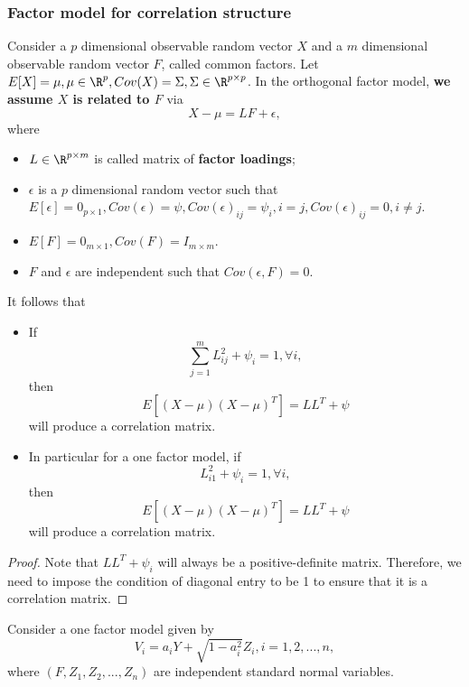 \begin{refsection}
\subsubsection{Factor model for correlation structure}

\begin{lemma}\label{ch:statistical-models:th:ConditionForCorrelationStructureFactorModel}
Consider a $p$ dimensional observable random vector $X$ and a $m$ dimensional observable random vector $F$, called common factors. Let $E[X] = \mu, \mu\in \R^p, Cov(X) = \Sigma,\Sigma\in\R^{p\times p}$. 
In the orthogonal factor model, \textbf{we assume $X$ is related to $F$} via
$$X - \mu = L F + \epsilon,$$
where 
\begin{itemize}
	\item $L\in \R^{p\times m}$ is called matrix of \textbf{factor loadings};
	\item $\epsilon$ is a $p$ dimensional random vector such that $E[\epsilon] = 0_{p\times 1}, Cov(\epsilon) = \psi, Cov(\epsilon)_{ij} = \psi_{i}, i = j, Cov(\epsilon)_{ij} = 0, i\neq j$.
	\item $E[F] = 0_{m\times 1}, Cov(F) = I_{m\times m}.$
	\item $F$ and $\epsilon$ are independent such that $Cov(\epsilon, F) = 0$.
\end{itemize}

It follows that
\begin{itemize}
	\item If 
	$$\sum_{j=1}^m L_{ij}^2 + \psi_i = 1, \forall i,$$
	then $$E[(X-\mu)(X-\mu)^T] = LL^T + \psi$$ will produce a correlation matrix.
	\item In particular for a one factor model, if
	$$ L_{i1}^2 + \psi_i = 1, \forall i,$$
	then $$E[(X-\mu)(X-\mu)^T] = LL^T + \psi$$ will produce a correlation matrix.
\end{itemize}	
\end{lemma}
\begin{proof}
Note that
	$LL^T + \psi_i$ will always be a positive-definite matrix. Therefore, we need to impose the condition of diagonal entry to be 1 to ensure that it is a correlation matrix.
\end{proof}


\begin{example}
	Consider a one factor model given by
$$V_i = a_i Y + \sqrt{1-a_i^2}Z_i, i=1,2,...,n,$$
where $(F,Z_1,Z_2,...,Z_n)$ are independent standard normal variables. 


\end{example}
\end{refsection}
